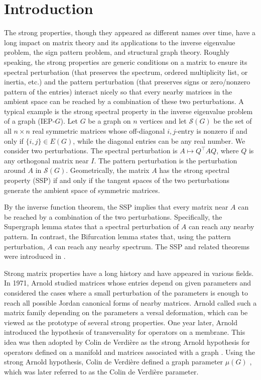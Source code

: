 \documentclass{article}
\theoremstyle{definition}
\newcommand{\trans}{^\top}
\newcommand{\mptn}{\mathcal{S}}
\begin{document}
\section{Introduction}

The strong properties, though they appeared as different names over time, have a long impact on matrix theory and its applications to the inverse eigenvalue problem, the sign pattern problem, and structural graph theory.  Roughly speaking, the strong properties are generic conditions on a matrix to ensure its spectral perturbation (that preserves the spectrum, ordered multiplicity list, or inertia, etc.) and the pattern perturbation (that preserves signs or zero/nonzero pattern of the entries) interact nicely so that every nearby matrices in the ambient space can be reached by a combination of these two perturbations.  A typical example is the strong spectral property in the inverse eigenvalue problem of a graph (IEP-$G$).  Let $G$ be a graph on $n$ vertices and let $\mptn(G)$ be the set of all $n\times n$ real symmetric matrices whose off-diagonal $i,j$-entry is nonzero if and only if $\{i,j\}\in E(G)$, while the diagonal entries can be any real number.  We consider two perturbations.  The spectral perturbation is $A\mapsto Q\trans AQ$, where $Q$ is any orthogonal matrix near $I$.  The pattern perturbation is the perturbation around $A$ in $\mptn(G)$.  Geometrically, the matrix $A$ has the strong spectral property (SSP) if and only if the tangent spaces of the two perturbations generate the ambient space of symmetric matrices.  

By the inverse function theorem, the SSP implies that every matrix near $A$ can be reached by a combination of the two perturbations.  Specifically, the Supergraph lemma states that a spectral perturbation of $A$ can reach any nearby pattern.  In contrast, the Bifurcation lemma states that, using the pattern perturbation, $A$ can reach any nearby spectrum.  The SSP and related theorems were introduced in \cite{gSAP, IEPG2, bifur}.  

Strong matrix properties have a long history and have appeared in various fields.  In 1971, Arnold \cite{Arnold71} studied matrices whose entries depend on given parameters and considered the cases where a small perturbation of the parameters is enough to reach all possible Jordan canonical forms of nearby matrices.  Arnold called such a matrix family depending on the parameters a versal deformation, which can be viewed as the prototype of several strong properties.  One year later, Arnold \cite{Arnold72} introduced the hypothesis of transversality for operators on a membrane. This idea was then adopted by Colin de Verdi\`ere as the strong Arnold hypothesis for operators defined on a manifold and matrices associated with a graph \cite{CdV88}.  Using the strong Arnold hypothesis, Colin de Verdi\`ere defined a graph parameter $\mu(G)$ \cite{CdV,CdVF}, which was later referred to as the Colin de Verdi\`ere parameter.  
\end{document}
